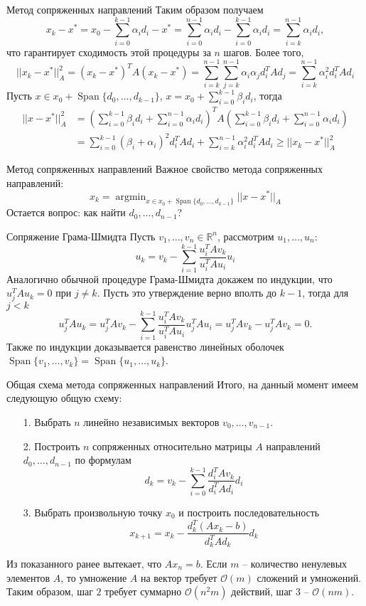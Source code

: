 \documentclass[10pt]{beamer}
\DeclareMathOperator{\argmin}{argmin}
\DeclareMathOperator{\lin}{Span}
\begin{document}
\begin{frame}{Метод сопряженных направлений}
Таким образом получаем
$$
x_k-x^*=x_0-\sum_{i=0}^{k-1}\alpha_id_i-x^*=\sum_{i=0}^{n-1}\alpha_id_i-\sum_{i=0}^{k-1}\alpha_id_i=\sum_{i=k}^{n-1}\alpha_id_i,
$$
что гарантирует сходимость этой процедуры за $n$ шагов. \pause Более того,
$$
||x_k-x^*||^2_A=(x_k-x^*)^TA(x_k-x^*)=\sum_{i=k}^{n-1}\sum_{j=k}^{n-1}\alpha_i\alpha_jd_i^TAd_j=\sum_{i=k}^{n-1}\alpha_i^2d_i^TAd_i
$$
Пусть $x\in x_0+\lin\{d_0, \ldots, d_{k-1}\}$, $x=x_0+\sum_{i=0}^{k-1}\beta_id_i$, тогда
\begin{align*}
||x-x^*||^2_A&=\left(\sum_{i=0}^{k-1}\beta_id_i+\sum_{i=0}^{n-1}\alpha_id_i\right)^TA\left(\sum_{i=0}^{k-1}\beta_id_i+\sum_{i=0}^{n-1}\alpha_id_i\right)\\
&=\sum_{i=0}^{k-1}(\beta_i+\alpha_i)^2d_i^TAd_i+\sum_{i=k}^{n-1}\alpha_i^2d_i^TAd_i\geq ||x_k-x^*||^2_A
\end{align*}
\end{frame}

\begin{frame}{Метод сопряженных направлений}
Важное свойство метода сопряженных направлений:
$$
x_k=\argmin_{x\in x_0+\lin\{d_0, \ldots, d_{k-1}\}}||x-x^*||_A
$$
\pause
\vspace{1em}
Остается вопрос: как найти $d_0, \ldots, d_{n-1}$?
\end{frame}

\begin{frame}{Сопряжение Грама-Шмидта}
Пусть $v_1, \ldots, v_n\in \mathbb{R}^n$, рассмотрим $u_1, \ldots, u_n$:
$$
u_k=v_k-\sum_{i=1}^{k-1}\frac{u_i^TAv_k}{u_i^TAu_i}u_i
$$ 
\pause
\vspace{1em}
Аналогично обычной процедуре Грама-Шмидта докажем по индукции, что $u_j^TAu_k=0$ при $j\neq k$. Пусть это утверждение верно вполть до $k-1$, тогда для $j<k$
$$
u^T_jAu_k=u^T_jAv_k-\sum_{i=1}^{k-1}\frac{u_i^TAv_k}{u_i^TAu_i}u^T_jAu_i=u_j^TAv_k-u_j^TAv_k=0.
$$
\pause
Также по индукции доказывается равенство линейных оболочек $\lin\{v_1, \ldots, v_k\}=\lin\{u_1, \ldots, u_k\}$.
\end{frame}

\begin{frame}{Общая схема метода сопряженных направлений}
Итого, на данный момент имеем следующую общую схему:\pause
\begin{itemize}[<+->]
\item[1.] Выбрать $n$ линейно независимых векторов $v_0, \ldots, v_{n-1}$.
\item[2.] Построить $n$ сопряженных относительно матрицы $A$ направлений $d_0, \ldots, d_{n-1}$ по формулам
$$
d_k=v_k-\sum_{i=0}^{k-1}\frac{d_i^TAv_k}{d_i^TAd_i}d_i
$$
\item[3.] Выбрать произвольную точку $x_0$ и построить последовательность
$$
x_{k+1}=x_k-\frac{d^T_k(Ax_k-b)}{d_k^TAd_k}d_k
$$
\end{itemize}
\pause
Из показанного ранее вытекает, что $Ax_n=b$. Если $m$ -- количество ненулевых элементов $A$, то умножение $A$ на вектор требует $\mathcal{O}(m)$ сложений и умножений. Таким образом, шаг $2$ требует суммарно $\mathcal{O}(n^2m)$ действий, шаг $3$ -- $\mathcal{O}(nm)$.
\end{frame}
\end{document}
